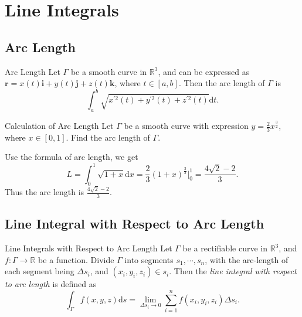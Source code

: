 
\section{Line Integrals}

\subsection{Arc Length}

\begin{proposition}{Arc Length}{}
  Let $\Gamma$ be a smooth curve in $\mathbb{R}^3$,
  and can be expressed as $\mathbf{r} = x(t)\mathbf{i} + y(t)\mathbf{j} +
  z(t)\mathbf{k}$, where $t \in [a, b]$.
  Then the arc length of $\Gamma$ is
  \begin{equation}
    \int_a^b \sqrt{x^{\prime 2}(t) + y^{\prime 2}(t) + z^{\prime 2}(t)}\mathrm{d} t.
  \end{equation}
\end{proposition}

\begin{example}{Calculation of Arc Length}{}
  Let $\Gamma$ be a smooth curve with expression $y = \frac{2}{3}
  x^{\frac{3}{2}}$,
  where $x \in [0, 1]$. Find the arc length of $\Gamma$.
\end{example}

\begin{solution}
  Use the formula of arc length, we get
  \begin{equation}
    L = \int_0^1 \sqrt{1 + x} \mathrm{d} x 
    = \frac{2}{3} (1 + x)^{\frac{3}{2}} \big|^1_0
    = \frac{4 \sqrt{2} - 2}{3}.
  \end{equation}
  Thus the arc length is $\frac{4 \sqrt{2} - 2}{3}$.
\end{solution}

\subsection{Line Integral with Respect to Arc Length}

\begin{definition}{Line Integrals with Respect to Arc Length}{}
  Let $\Gamma$ be a rectifiable curve in $\mathbb{R}^3$,
  and $f: \Gamma \rightarrow \mathbb{R}$ be a function.
  Divide $\Gamma$ into segments $s_1,\cdots,s_n$, with the arc-length of each
  segment being $\Delta s_i$, and $(x_i, y_i, z_i) \in s_i$.
  Then the \emph{line integral with respect to arc length} is defined as
  \begin{equation}
    \int_{\Gamma} f(x,y,z)\mathrm{d} s = \lim \limits _{\Delta s_i \rightarrow 0}
    \sum\limits_{i = 1}^n f(x_i, y_i, z_i) \Delta s_i.
  \end{equation}
\end{definition}

